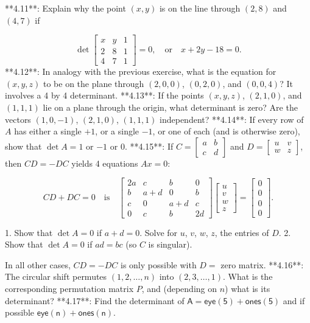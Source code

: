 

**4.11**: Explain why the point \((x,y)\) is on the line through \((2,8)\) and \((4,7)\) if

\[\det\begin{bmatrix}x&y&1\\ 2&8&1\\ 4&7&1\end{bmatrix}=0,\quad\text{or}\quad x+2y-18=0.\]
**4.12**: In analogy with the previous exercise, what is the equation for \((x,y,z)\) to be on the plane through \((2,0,0)\), \((0,2,0)\), and \((0,0,4)\)? It involves a 4 by 4 determinant.
**4.13**: If the points \((x,y,z)\), \((2,1,0)\), and \((1,1,1)\) lie on a plane through the origin, what determinant is zero? Are the vectors \((1,0,-1)\), \((2,1,0)\), \((1,1,1)\) independent?
**4.14**: If every row of \(A\) has either a single \(+1\), or a single \(-1\), or one of each (and is otherwise zero), show that \(\det A=1\) or \(-1\) or \(0\).
**4.15**: If \(C=\begin{bmatrix}a&b\\ c&d\end{bmatrix}\) and \(D=\begin{bmatrix}u&v\\ w&z\end{bmatrix}\), then \(CD=-DC\) yields 4 equations \(Ax=0\):

\[CD+DC=0\quad\text{is}\quad\begin{bmatrix}2a&c&b&0\\ b&a+d&0&b\\ c&0&a+d&c\\ 0&c&b&2d\end{bmatrix}\begin{bmatrix}u\\ v\\ w\\ z\end{bmatrix}=\begin{bmatrix}0\\ 0\\ 0\\ 0\end{bmatrix}.\]

1. Show that \(\det A=0\) if \(a+d=0\). Solve for \(u\), \(v\), \(w\), \(z\), the entries of \(D\).
2. Show that \(\det A=0\) if \(ad=bc\) (so \(C\) is singular).

In all other cases, \(CD=-DC\) is only possible with \(D=\) zero matrix.
**4.16**: The circular shift permutes \((1,2,\ldots,n)\) into \((2,3,\ldots,1)\). What is the corresponding permutation matrix \(P\), and (depending on \(n\)) what is its determinant?
**4.17**: Find the determinant of \(\mathsf{A}=\mathsf{eye}(\mathsf{5})+\mathsf{ones}(\mathsf{5})\) and if possible \(\mathsf{eye}(\mathsf{n})+\mathsf{ones}(\mathsf{n})\).

